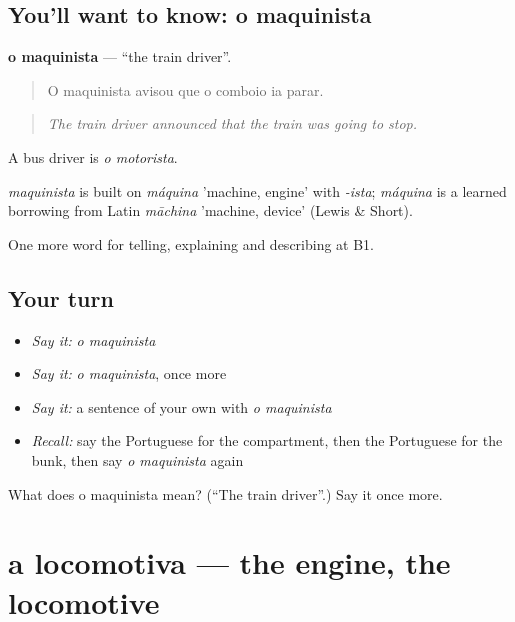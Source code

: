 \subsection*{You'll want to know: o maquinista}
\textbf{o maquinista} — \textquotedblleft{}the train driver\textquotedblright{}.

\begin{quote}
O maquinista avisou que o comboio ia parar.
\end{quote}

\begin{quote}
\emph{The train driver announced that the train was going to stop.}
\end{quote}

A bus driver is \emph{o motorista}.

\begin{cousinweb}
\emph{maquinista} is built on \emph{máquina} 'machine, engine' with \emph{-ista}; \emph{máquina} is a learned borrowing from Latin \emph{māchina} 'machine, device' (Lewis \& Short).
\end{cousinweb}

\begin{grammarlens}[title={What you've built}]
One more word for telling, explaining and describing at B1.
\end{grammarlens}

\subsection*{Your turn}
\begin{itemize}
\raggedright
  \item \emph{Say it:} \emph{o maquinista}
  \item \emph{Say it:} \emph{o maquinista}, once more
  \item \emph{Say it:} a sentence of your own with \emph{o maquinista}
  \item \emph{Recall:} say the Portuguese for the compartment, then the Portuguese for the bunk, then say \emph{o maquinista} again
\end{itemize}

\begin{tcolorbox}[breakable,colback=teal!4,colframe=teal!35!black,title={Before you move on}]
What does o maquinista mean? (\textquotedblleft{}The train driver\textquotedblright{}.) Say it once more.
\end{tcolorbox}
\section[a locomotiva]{a locomotiva — the engine, the locomotive}

